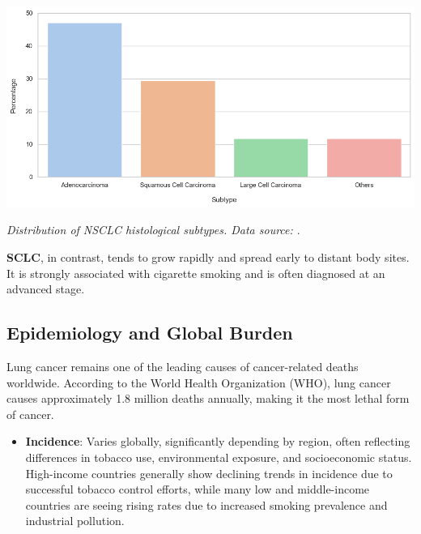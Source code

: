 \vspace{1em}
\begin{center}
    \includegraphics[width=1.00\textwidth]{../assets/01-overview/nsclc-dist.png}

    \small\textit{Distribution of NSCLC histological subtypes. Data source: \cite{nlm2025}}.
\end{center}
\vspace{1em}

\textbf{SCLC}, in contrast, tends to grow rapidly and spread early to distant body sites. It is 
strongly associated with cigarette smoking and is often diagnosed at an advanced stage.


\subsection{Epidemiology and Global Burden}

Lung cancer remains one of the leading causes of cancer-related deaths worldwide. According to the 
World Health Organization (WHO), lung cancer causes approximately 1.8 million deaths annually, 
making it the most lethal form of cancer. \cite{who2024}

\begin{itemize}
    \item \textbf{Incidence}: Varies globally, significantly depending by region, often reflecting 
    differences in tobacco use, environmental exposure, and socioeconomic status. High-income 
    countries generally show declining trends in incidence due to successful tobacco control 
    efforts, while many low and middle-income countries are seeing rising rates due to increased 
    smoking prevalence and industrial pollution.
\end{itemize}

